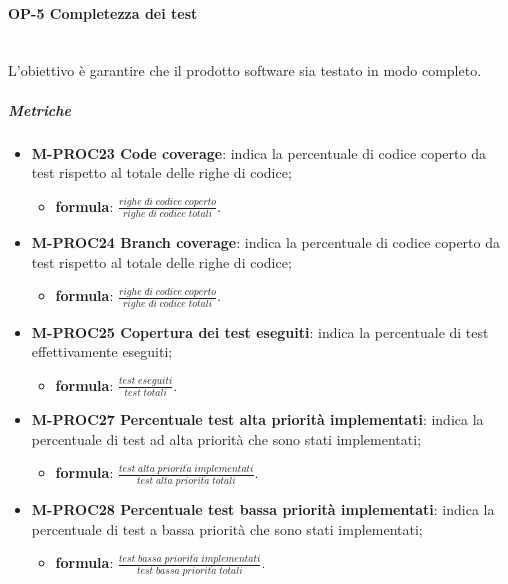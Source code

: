 	\paragraph{OP-5 Completezza dei test} \mbox{} \\ [1mm]
	L'obiettivo è garantire che il prodotto software sia testato in modo completo.
	\subparagraph{Metriche}
	\begin{itemize}
		\item \textbf{M-PROC23 Code coverage}: indica la percentuale di codice coperto da test rispetto al totale delle righe di codice;
		\begin{itemize}
			\item[] \textbf{formula}: $\frac{righe \; di \; codice \; coperto}{righe \; di \; codice \; totali}$.
		\end{itemize} 
	
		\item \textbf{M-PROC24 Branch coverage}: indica la percentuale di codice coperto da test rispetto al totale delle righe di codice;
		\begin{itemize}
			\item[] \textbf{formula}: $\frac{righe \; di \; codice \; coperto}{righe \; di \; codice \; totali}$.
		\end{itemize} 
	
		\item \textbf{M-PROC25 Copertura dei test eseguiti}: indica la percentuale di test effettivamente eseguiti;
		\begin{itemize}
			\item[] \textbf{formula}: $\frac{test \; eseguiti}{test \; totali}$.
		\end{itemize}
	
		\item \textbf{M-PROC27 Percentuale test alta priorità implementati}: indica la percentuale di test ad alta priorità che sono stati implementati;
		\begin{itemize}
			\item[] \textbf{formula}: $\frac{test \; alta \; priorit\grave{a} \; implementati}{test \; alta \; priorit\grave{a} \; totali}$.
		\end{itemize}
	
		\item \textbf{M-PROC28 Percentuale test bassa priorità implementati}: indica la percentuale di test a bassa priorità che sono stati implementati;
		\begin{itemize}
			\item[] \textbf{formula}: $\frac{test \; bassa \; priorit\grave{a} \; implementati}{test \; bassa \; priorit\grave{a} \; totali}$.
		\end{itemize}
	\end{itemize}

